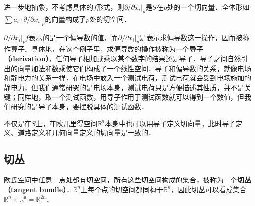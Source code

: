 进一步地抽象，不考虑具体的$f$形式，则$\partial/\partial x_i|_{p}$是$S$在$p$处的一个切向量．全体形如$\sum a_i\cdot\partial/\partial x_i|_{p}$的向量构成了$p$处的切空间．

$\partial/\partial x_i|_{p}f$表示的是一个偏导数的值，而$\partial/\partial x_i|_{p}$是表示求偏导数这一操作，因而被称作算子．具体地，在这个例子里，求偏导数的操作被称为一个\textbf{导子（derivation）}，任何导子相加或乘以某个数字的结果还是导子．导子之间自然引出的向量加法和数乘使它们构成了一个线性空间．导子和偏导数的关系，就像电场和静电力的关系一样．在电场中放入一个测试电荷，测试电荷就会受到电场施加的静电力，但我们通常研究的是电场本身，测试电荷只是方便描述其性质，并不是关键；同样地，取一个测试函数，用导子作用于测试函数就可以得到一个数值，但我们研究的是导子本身，要摆脱具体的测试函数．

不仅是在$S$上，在欧几里得空间$\mathbb{R}^n$本身中也可以用导子定义切向量，此时导子定义、道路定义和几何向量定义的切向量是一致的．

\subsection{切丛}

欧氏空间中任意一点处都有切空间，所有这些切空间构成的集合，被称为一个\textbf{切丛（tangent bundle）}．$\mathbb{R}^n$上每个点的切空间都同构于$\mathbb{R}^n$，因此切丛可以看成集合$\mathbb{R}^n\times\mathbb{R}^n=\mathbb{R}^{2n}$．







